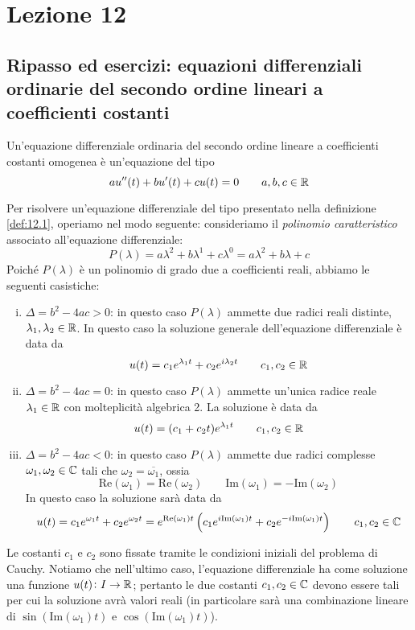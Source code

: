 \section{Lezione 12}
\subsection{Ripasso ed esercizi: equazioni differenziali ordinarie del secondo ordine lineari a coefficienti costanti}
\begin{definition}
    \label{def:12.1}
    Un'equazione differenziale ordinaria del secondo ordine lineare a coefficienti costanti omogenea è un'equazione del tipo
    \[
    au''(t)+bu'(t)+cu(t) = 0 \qquad a,b,c\in\amsbb{R}
    \]
\end{definition}
Per risolvere un'equazione differenziale del tipo presentato nella definizione \ref{def:12.1}, operiamo nel modo seguente: consideriamo il \emph{polinomio caratteristico} associato all'equazione differenziale:
\[
P(\lambda) = a \lambda^2 +b\lambda^1 + c \lambda^0 = a\lambda^2 +b\lambda + c
\]
Poiché $P(\lambda)$ è un polinomio di grado due a coefficienti reali, abbiamo le seguenti casistiche:
\begin{enumerate}[(i)]
    \item $\Delta = b^2-4ac>0$: in questo caso $P(\lambda)$ ammette due radici reali distinte, $\lambda_1, \lambda_2\in\amsbb{R}$. In questo caso la soluzione generale dell'equazione differenziale è data da
    \[
    u(t) = c_1 e^{\lambda_1 t} + c_2 e^{i\lambda_2 t} \qquad c_1, c_2\in\amsbb{R}
    \]
    \item $\Delta = b^2-4ac = 0$: in questo caso $P(\lambda)$ ammette un'unica radice reale $\lambda_1\in\amsbb{R}$ con molteplicità algebrica 2. La soluzione è data da
    \[
    u(t) = (c_1 +c_2 t)e^{\lambda_1 t} \qquad c_1, c_2\in\amsbb{R}
    \]
    \item $\Delta= b^2-4ac<0$: in questo caso $P(\lambda)$ ammette due radici complesse $\omega_1, \omega_2\in\amsbb{C}$ tali che $\omega_2 = \overline{\omega_1}$, ossia
    \[
    \text{Re}(\omega_1) = \text{Re}(\omega_2) \qquad \text{Im}(\omega_1) = -\text{Im}(\omega_2)
    \]
    In questo caso la soluzione sarà data da
    \[
    u(t) = c_1 e^{\omega_1 t} + c_2 e^{\omega_2 t} = e^{\text{Re}(\omega_1)t}\left(c_1 e^{i\text{Im}(\omega_1)t} + c_2 e^{-i \text{Im}(\omega_1)t}\right) \qquad c_1, c_2\in\amsbb{C}
    \]
\end{enumerate}
\begin{remark}
    Le costanti $c_1$ e $c_2$ sono fissate tramite le condizioni iniziali del problema di Cauchy. Notiamo che nell'ultimo caso, l'equazione differenziale ha come soluzione una funzione $u(t)\colon I \to \amsbb{R}$; pertanto le due costanti $c_1, c_2\in\amsbb{C}$ devono essere tali per cui la soluzione avrà valori reali (in particolare sarà una combinazione lineare di $\sin(\text{Im}(\omega_1)t)$ e $\cos(\text{Im}(\omega_1)t)$).
\end{remark}
